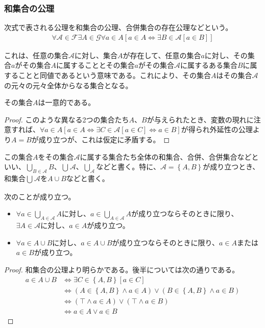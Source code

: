 \documentclass[a4paper]{jsarticle}
\begin{document}
\subsubsection{和集合の公理}%
\begin{axs}\label{和集合の公理}
次式で表される公理を和集合の公理、合併集合の存在公理などという。
\begin{align*}
\forall\mathcal{A}\in \mathcal{F\exists}A \in \mathcal{G\forall}a \in A\left[ a \in A \Leftrightarrow \exists B \in \mathcal{A}[ a \in B] \right]
\end{align*}
\end{axs}
これは、任意の集合$\mathcal{A}$に対し、集合$A$が存在して、任意の集合$a$に対し、その集合$a$がその集合$A$に属することとその集合$a$がその集合$\mathcal{A}$に属するある集合$B$に属することと同値であるという意味である。これにより、その集合$A$はその集合$\mathcal{A}$の元々の元々全体からなる集合となる。
\begin{thm}
\label{1.2.1.4}
その集合$A$は一意的である。
\end{thm}
\begin{proof}
このような異なる2つの集合たち$A$、$B$が与えられたとき、変数の現れに注意すれば、$\forall a \in A\left[ a \in A \Leftrightarrow \exists C \in \mathcal{A}[ a \in C] \Leftrightarrow a \in B \right]$が得られ外延性の公理より$A = B$が成り立つが、これは仮定に矛盾する。
\end{proof}
\begin{dfn}
この集合$A$をその集合$\mathcal{A}$に属する集合たち全体の和集合、合併、合併集合などといい、$\bigcup_{B \in \mathcal{A}} B$、$\bigcup_{} \mathcal{A}$、$\bigcup_{\mathcal{A}} $などと書く。特に、$\mathcal{A} =\left\{ A,B \right\}$が成り立つとき、和集合$\bigcup_{} \mathcal{A}$を$A \cup B$などと書く。
\end{dfn}
\begin{thm}
\label{1.2.1.5}
次のことが成り立つ。
\begin{itemize}
\item
  $\forall a \in \bigcup_{A \in \mathcal{A}} A$に対し、$a \in \bigcup_{A \in \mathcal{A}} A$が成り立つならそのときに限り、$\exists A \in \mathcal{A}$に対し、$a \in A$が成り立つ。
\item
  $\forall a \in A \cup B$に対し、$a \in A \cup B$が成り立つならそのときに限り、$a \in A$または$a \in B$が成り立つ。
\end{itemize}
\end{thm}
\begin{proof}
和集合の公理より明らかである。後半については次の通りである。
\begin{align*}
a \in A \cup B &\Leftrightarrow \exists C \in \left\{ A,B \right\}[ a \in C] \\
&\Leftrightarrow \left( A \in \left\{ A,B \right\} \land a \in A \right) \vee \left( B \in \left\{ A,B \right\} \land a \in B \right) \\
&\Leftrightarrow (\top \land a \in A) \vee (\top \land a \in B) \\
&\Leftrightarrow a \in A \vee a \in B
\end{align*}
\end{proof}
\end{document}
